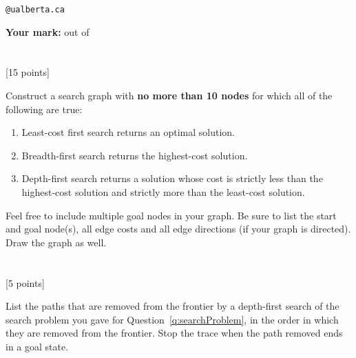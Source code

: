 \documentclass[10pt]{article}
\newcommand{\ben}{\begin{enumerate}}
\newcommand{\een}{\end{enumerate}}
\newcommand{\ie}{\item}
\newcommand{\tcv}[1]{\textcolor{m4}{#1}}
\newcounter{totalpoints}
\newcommand{\points}[1]{{\addtocounter{totalpoints}{#1}\tcv{[#1 points]}}}
\begin{document}
\vspace{1cm}
\hspace{1cm}{\bf Last name:} \underline{\hspace{7cm}}

\vspace{1cm}
\hspace{1cm}{\bf CCID:} \underline{\hspace{5.5cm}}\verb|@ualberta.ca|

\vspace{1cm}
\hspace{1cm}{\bf Collaborators:} \underline{\hspace{6.5cm}}

\vspace{3cm}
{\Large\tcv{{\bf Your mark:} \underline{\hspace{1cm}} out of \total{totalpoints}}}


\clearpage
\section{}
\points{15} \label{q:searchProblem}
Construct a search graph with \textbf{no more than 10 nodes} for which all of the following are true:
\ben
\ie Least-cost first search returns an optimal solution.
\ie Breadth-first search returns the highest-cost solution.
\ie Depth-first search returns a solution whose cost is strictly less than the highest-cost solution and strictly more than the least-cost solution.
\een
Feel free to include multiple goal nodes in your graph. Be sure to list the start and goal node(s), all edge costs and all edge directions (if your graph is directed). Draw the graph as well.

\begin{answer}{3in}
\end{answer}


\section{} 
\points{5} 
List the paths that are removed from the frontier by a depth-first search of the search problem you gave for Question~\ref{q:searchProblem}, in the order in which they are removed from the frontier. Stop the trace when the path removed ends in a goal state.

\begin{answer}{1.2in}
\end{answer}
\end{document}
